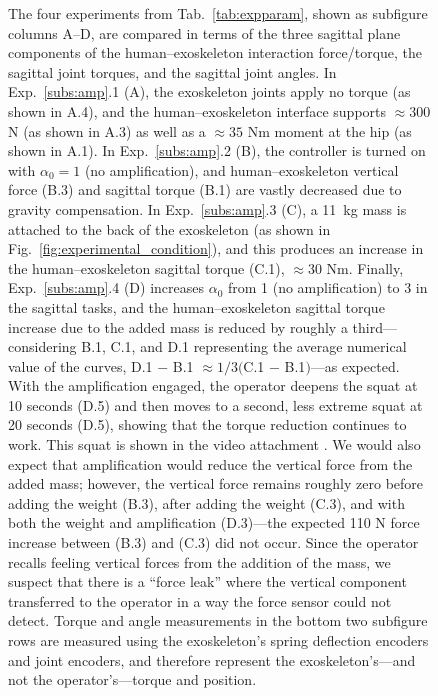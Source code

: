 \documentclass[utf8]{frontiersSCNS}
\renewcommand*{\cite}[1]{\citep{#1}}
\begin{document}
\begin{figure}[!tp]%
	\centering\resizebox{1\textwidth}{!}{\def\svgwidth{\textwidth}\footnotesize%
	}%
	\caption{The four experiments from Tab.~\ref{tab:expparam}, shown as subfigure columns A--D, are compared in terms of the three sagittal plane components of the human--exoskeleton interaction force/torque, the sagittal joint torques, and the sagittal joint angles. In Exp.~\ref{subs:amp}.1 (A), the exoskeleton joints apply no torque (as shown in A.4), and the human--exoskeleton interface supports $\approx300$ N (as shown in A.3) as well as a $\approx35$ Nm moment at the hip (as shown in A.1). In Exp.~\ref{subs:amp}.2 (B), the controller is turned on with $\alpha_0=1$ (no amplification), and human--exoskeleton vertical force (B.3) and sagittal torque (B.1) are vastly decreased due to gravity compensation. In Exp.~\ref{subs:amp}.3 (C), a 11~kg mass is attached to the back of the exoskeleton (as shown in Fig.~\ref{fig:experimental_condition}), and this produces an increase in the human--exoskeleton sagittal torque (C.1), $\approx30$ Nm. Finally, Exp.~\ref{subs:amp}.4 (D) increases $\alpha_0$ from 1 (no amplification) to 3 in the sagittal tasks, and the human--exoskeleton sagittal torque increase due to the added mass is reduced by roughly a third---considering B.1, C.1, and D.1 representing the average numerical value of the curves, D.1 $-$ B.1 $\approx 1/3($C.1 $-$ B.1$)$---as expected. With the amplification engaged, the operator deepens the squat at 10 seconds (D.5) and then moves to a second, less extreme squat at 20 seconds (D.5), showing that the torque reduction continues to work. This squat is shown in the video attachment  \cite{Thomas2020Youtube}. We would also expect that amplification would reduce the vertical force from the added mass; however, the vertical force remains roughly zero before adding the weight (B.3), after adding the weight (C.3), and with both the weight and amplification (D.3)---the expected 110 N force increase between (B.3) and (C.3) did not occur. Since the operator recalls feeling vertical forces from the addition of the mass, we suspect that there is a ``force leak'' where the vertical component transferred to the operator in a way the force sensor could not detect. Torque and angle measurements in the bottom two subfigure rows are measured using the exoskeleton's spring deflection encoders and joint encoders, and therefore represent the exoskeleton's---and not the operator's---torque and position.
	}\label{fig:experiment}
\end{figure}
\end{document}
